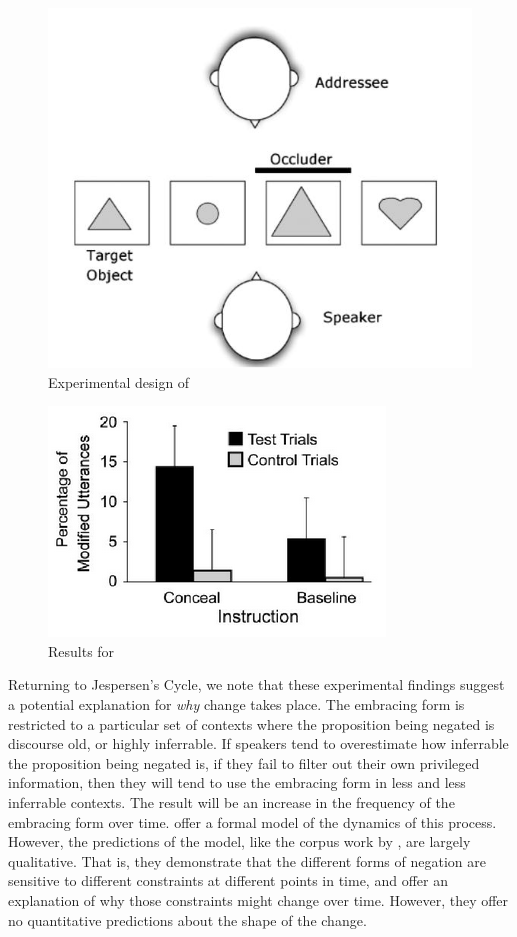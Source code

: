 \begin{figure}
\begin{center}
\includegraphics[width=.7\textwidth]{elephants-exp.png}          
\end{center}
  \caption{Experimental design of \cite{lane-etal2006}}
   \label{elephants-exp}
\end{figure}


\begin{figure}
\begin{center}
\includegraphics[width=.7\textwidth]{elephant-results.png}          
\end{center}
  \caption{Results for \cite{lane-etal2006}}
   \label{elephants-results}
\end{figure}

Returning to Jespersen's Cycle, we note that these experimental findings suggest a potential explanation for \emph{why} change takes place. The embracing form is restricted to a particular set of contexts where the proposition being negated is discourse old, or highly inferrable. If speakers tend to overestimate how inferrable the proposition being negated is, if they fail to filter out their own privileged information, then they will tend to use the embracing form in less and less inferrable contexts. The result will be an increase in the frequency of the embracing form over time. \cite{ahern-clark2015} offer a formal model of the dynamics of this process. However, the predictions of the model, like the corpus work by \cite{hansen2009, hansen-visconti2009}, are largely qualitative. That is, they demonstrate that the different forms of negation are sensitive to different constraints at different points in time, and offer an explanation of why those constraints might change over time. However, they offer no 
quantitative predictions about the shape of the change.


